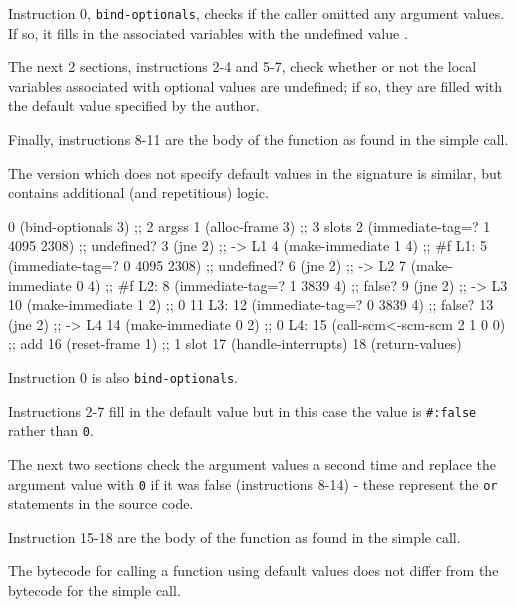 Instruction 0, \texttt{bind-optionals}, checks if the caller omitted any argument values.
If so, it fills in the associated variables with the undefined value
\parencite[][libguile/vm-engine.c lines 3213-3233]{guile-source}.

The next 2 sections, instructions 2-4 and 5-7, check whether or not the local variables
associated with optional values are undefined; if so, they are filled with the default
value specified by the author.

Finally, instructions 8-11 are the body of the function as found in the simple call.

The version which does not specify default values in the signature is similar, but
contains additional (and repetitious) logic.

\begin{pygmented}[lang=lisp]
 0 (bind-optionals 3)              ;; 2 argss
 1 (alloc-frame 3)                 ;; 3 slots
 2 (immediate-tag=? 1 4095 2308)   ;; undefined?
 3 (jne 2)                         ;; -> L1
 4 (make-immediate 1 4)            ;; #f
L1:
 5 (immediate-tag=? 0 4095 2308)   ;; undefined?
 6 (jne 2)                         ;; -> L2
 7 (make-immediate 0 4)            ;; #f
L2:
 8 (immediate-tag=? 1 3839 4)      ;; false?
 9 (jne 2)                         ;; -> L3
10 (make-immediate 1 2)            ;; 0
11 L3:
12 (immediate-tag=? 0 3839 4)      ;; false?
13 (jne 2)                         ;; -> L4
14 (make-immediate 0 2)            ;; 0
L4:
15 (call-scm<-scm-scm 2 1 0 0)     ;; add
16 (reset-frame 1)                 ;; 1 slot
17 (handle-interrupts)             
18 (return-values)                 
\end{pygmented}

Instruction 0 is also \texttt{bind-optionals}.

Instructions 2-7 fill in the default value but in this case the value is
\texttt{\#:false} rather than \texttt{0}.

The next two sections check the argument values a second time and replace the argument
value with \texttt{0} if it was false (instructions 8-14) - these represent the
\texttt{or} statements in the source code.

Instruction 15-18 are the body of the function as found in the simple call.

The bytecode for calling a function using default values does not differ from the bytecode
for the simple call.

